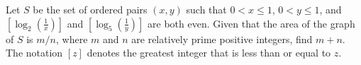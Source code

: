 Let $S$ be the set of ordered pairs $(x, y)$ such that $0<x\le 1$, $0<y\le 1$, and $\left[\log_2{\left(\frac 1x\right)}\right]$ and $\left[\log_5{\left(\frac 1y\right)}\right]$ are both even. Given that the area of the graph of $S$ is $m/n$, where $m$ and $n$ are relatively prime positive integers, find $m+n$. The notation $[z]$ denotes the greatest integer that is less than or equal to $z$.
